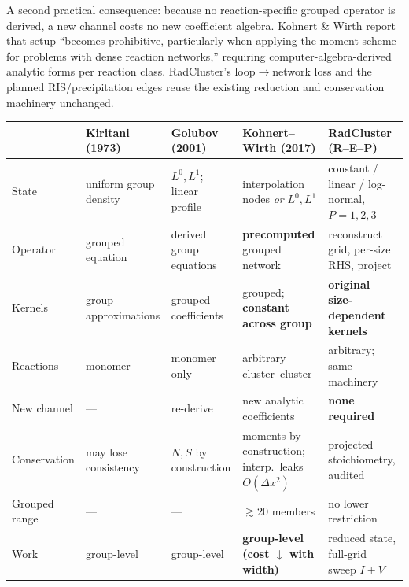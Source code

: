 \documentclass[11pt,a4paper]{article}
\begin{document}
A second practical consequence: because no reaction-specific grouped operator is
derived, a new channel costs no new coefficient algebra. Kohnert \& Wirth report
that setup ``becomes prohibitive, particularly when applying the moment scheme
for problems with dense reaction networks,'' requiring computer-algebra-derived
analytic forms per reaction class. RadCluster's loop$\rightarrow$network loss and
the planned RIS/precipitation edges reuse the existing reduction and conservation
machinery unchanged.

\begin{center}\footnotesize\setlength{\tabcolsep}{4pt}
\begin{tabular}{@{}p{1.9cm}p{2.7cm}p{3.0cm}p{3.5cm}p{4.3cm}@{}}
\toprule
& \textbf{Kiritani (1973)} & \textbf{Golubov (2001)} & \textbf{Kohnert--Wirth (2017)} & \textbf{RadCluster (R--E--P)} \\
\midrule
State & uniform group density & $L^0,L^1$; linear profile & interpolation nodes \emph{or} $L^0,L^1$ & constant / linear / log-normal, $P=1,2,3$ \\
Operator & grouped equation & derived group equations & \textbf{precomputed} grouped network & reconstruct grid, per-size RHS, project \\
Kernels & group approximations & grouped coefficients & grouped; \textbf{constant across group} & \textbf{original size-dependent kernels} \\
Reactions & monomer & monomer only & arbitrary cluster--cluster & arbitrary; same machinery \\
New channel & --- & re-derive & new analytic coefficients & \textbf{none required} \\
Conservation & may lose consistency & $N,S$ by construction & moments by construction; interp.\ leaks $O(\Delta x^2)$ & projected stoichiometry, audited \\
Grouped range & --- & --- & $\gtrsim20$ members & no lower restriction \\
Work & group-level & group-level & \textbf{group-level (cost $\downarrow$ with width)} & reduced state, full-grid sweep $I{+}V$ \\
\bottomrule
\end{tabular}
\end{center}
\end{document}
